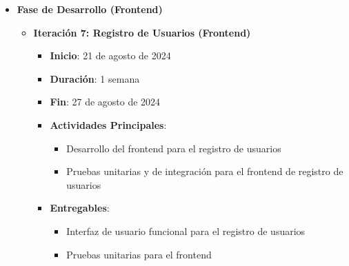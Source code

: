 \begin{itemize}
    \item \textbf{Fase de Desarrollo (Frontend)}
          \begin{itemize}
              \item \textbf{Iteración 7: Registro de Usuarios (Frontend)}
                    \begin{itemize}
                        \item \textbf{Inicio}: 21 de agosto de 2024
                        \item \textbf{Duración}: 1 semana
                        \item \textbf{Fin}: 27 de agosto de 2024
                        \item \textbf{Actividades Principales}:
                              \begin{itemize}
                                  \item Desarrollo del frontend para el registro de usuarios
                                  \item Pruebas unitarias y de integración para el frontend de registro de usuarios
                              \end{itemize}
                        \item \textbf{Entregables}:
                              \begin{itemize}
                                  \item Interfaz de usuario funcional para el registro de usuarios
                                  \item Pruebas unitarias para el frontend
                              \end{itemize}
                    \end{itemize}


\end{itemize}
\end{itemize}
